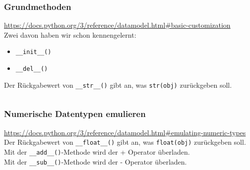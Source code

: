 \begin{minipage}[t]{0.44\textwidth}
	\subsubsection{Grundmethoden}
	\url{https://docs.python.org/3/reference/datamodel.html#basic-customization}\\
	Zwei davon haben wir schon kennengelernt:
	\begin{itemize}
		\item \texttt{\_\_init\_\_()}
		\item \texttt{\_\_del\_\_()}
	\end{itemize}
	Der Rückgabewert von \texttt{\_\_str\_\_()} gibt an, was \texttt{str(obj)} zurückgeben soll.
\end{minipage}
\begin{minipage}[t]{0.02\textwidth} $\quad$ \end{minipage}
\begin{minipage}[t]{0.54\textwidth}
	
\end{minipage}


\begin{minipage}[t]{0.44\textwidth}
	\subsubsection{Numerische Datentypen emulieren}
	\url{https://docs.python.org/3/reference/datamodel.html#emulating-numeric-types}\\
	Der Rückgabewert von \texttt{\_\_float\_\_()} gibt an, was \texttt{float(obj)} zurückgeben soll.\\
	Mit der \texttt{\_\_add\_\_()}-Methode wird der + Operator überladen.\\
	Mit der \texttt{\_\_sub\_\_()}-Methode wird der - Operator überladen.
\end{minipage}
\begin{minipage}[t]{0.02\textwidth} $\quad$ \end{minipage}
\begin{minipage}[t]{0.54\textwidth}
	
\end{minipage}



